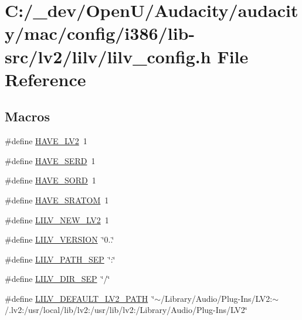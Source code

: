 \hypertarget{mac_2config_2i386_2lib-src_2lv2_2lilv_2lilv__config_8h}{}\section{C\+:/\+\_\+dev/\+Open\+U/\+Audacity/audacity/mac/config/i386/lib-\/src/lv2/lilv/lilv\+\_\+config.h File Reference}
\label{mac_2config_2i386_2lib-src_2lv2_2lilv_2lilv__config_8h}
\subsection*{Macros}
\begin{DoxyCompactItemize}
\item 
\#define \hyperlink{mac_2config_2i386_2lib-src_2lv2_2lilv_2lilv__config_8h_a3377686d402043f36819f446ef0e0edd}{H\+A\+V\+E\+\_\+\+L\+V2}~1
\item 
\#define \hyperlink{mac_2config_2i386_2lib-src_2lv2_2lilv_2lilv__config_8h_af73dc1c61a8c088c96f3a0f3a85b75dd}{H\+A\+V\+E\+\_\+\+S\+E\+RD}~1
\item 
\#define \hyperlink{mac_2config_2i386_2lib-src_2lv2_2lilv_2lilv__config_8h_a49c11735861a0675e6a29e557c574eab}{H\+A\+V\+E\+\_\+\+S\+O\+RD}~1
\item 
\#define \hyperlink{mac_2config_2i386_2lib-src_2lv2_2lilv_2lilv__config_8h_a91813cd212335e12e385f5197134a136}{H\+A\+V\+E\+\_\+\+S\+R\+A\+T\+OM}~1
\item 
\#define \hyperlink{mac_2config_2i386_2lib-src_2lv2_2lilv_2lilv__config_8h_af0100814b9a792698841cf0a8ffbcf56}{L\+I\+L\+V\+\_\+\+N\+E\+W\+\_\+\+L\+V2}~1
\item 
\#define \hyperlink{mac_2config_2i386_2lib-src_2lv2_2lilv_2lilv__config_8h_a3f20e0a84489663e26aa644e2bae4c19}{L\+I\+L\+V\+\_\+\+V\+E\+R\+S\+I\+ON}~\char`\"{}0..\char`\"{}
\item 
\#define \hyperlink{mac_2config_2i386_2lib-src_2lv2_2lilv_2lilv__config_8h_a4ae8b5357794ac90229532569f0acc86}{L\+I\+L\+V\+\_\+\+P\+A\+T\+H\+\_\+\+S\+EP}~\char`\"{}\+:\char`\"{}
\item 
\#define \hyperlink{mac_2config_2i386_2lib-src_2lv2_2lilv_2lilv__config_8h_aaa0ba9f096da7391eb54ba228e47907a}{L\+I\+L\+V\+\_\+\+D\+I\+R\+\_\+\+S\+EP}~\char`\"{}/\char`\"{}
\item 
\#define \hyperlink{mac_2config_2i386_2lib-src_2lv2_2lilv_2lilv__config_8h_adce8861513530872156c039fb0b92e45}{L\+I\+L\+V\+\_\+\+D\+E\+F\+A\+U\+L\+T\+\_\+\+L\+V2\+\_\+\+P\+A\+TH}~\char`\"{}$\sim$/Library/Audio/Plug-\/Ins/L\+V2\+:$\sim$/.lv2\+:/usr/local/lib/lv2\+:/usr/lib/lv2\+:/Library/Audio/Plug-\/Ins/L\+V2\char`\"{}
\end{DoxyCompactItemize}


